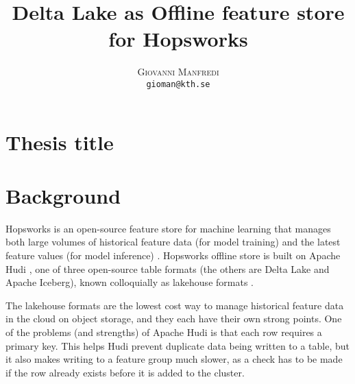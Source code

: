 \documentclass[12pt,twoside,english]{article}
\title{Delta Lake as Offline feature store for Hopsworks}
\author{
        \textsc{Giovanni Manfredi}\\
        \normalsize
            \texttt{gioman@kth.se}
}
\makeatletter
\let\mytitle\@title
\makeatother
\begin{document}
\maketitle







\section{Thesis title}
\mytitle

\section{Background}
\label{sect:background}

Hopsworks is an open-source feature store for machine learning that manages both large volumes of historical feature data (for model training) and the latest feature values (for model inference) \cite{hopsworks, hopsworks2015}. Hopsworks offline store is built on Apache Hudi \cite{ApacheHudi2019}, one of three open-source table formats (the others are Delta Lake and Apache Iceberg), known colloquially as lakehouse formats \cite{lakehouse2021}. 

The lakehouse formats are the lowest cost way to manage historical feature data in the cloud on object storage, and they each have their own strong points. One of the problems (and strengths) of Apache Hudi is that each row requires a primary key. This helps Hudi prevent duplicate data being written to a table, but it also makes writing to a feature group much slower, as a check has to be made if the row already exists before it is added to the cluster. 
\end{document}
